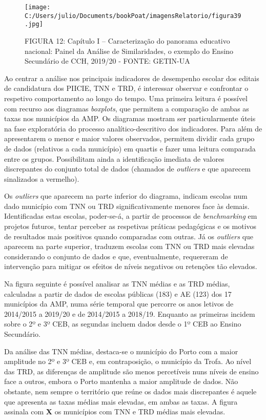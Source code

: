 \documentclass[
]{book}
\begin{document}
\begin{figure}
\centering
\texttt{[image: C:/Users/julio/Documents/bookPoat/imagensRelatorio/figura39.jpg]}
\caption{FIGURA 12: Capítulo I -- Caracterização do panorama educativo nacional: Painel da Análise de Similaridades, o exemplo do Ensino Secundário de CCH, 2019/20 - FONTE: GETIN-UA}
\end{figure}

Ao centrar a análise nos principais indicadores de desempenho escolar dos editais de candidatura dos PIICIE, TNN e TRD, é interessar observar e confrontar o respetivo comportamento ao longo do tempo. Uma primeira leitura é possível com recurso aos diagramas \emph{boxplots}, que permitem a comparação de ambas as taxas nos municípios da AMP. Os diagramas mostram ser particularmente úteis na fase exploratória do processo analítico-descritivo dos indicadores. Para além de apresentarem o menor e maior valores observados, permitem dividir cada grupo de dados (relativos a cada município) em quartis e fazer uma leitura comparada entre os grupos. Possibilitam ainda a identificação imediata de valores discrepantes do conjunto total de dados (chamados de \emph{outliers} e que aparecem sinalizados a vermelho).

Os \emph{outliers} que aparecem na parte inferior do diagrama, indicam escolas num dado município com TNN ou TRD significativamente menores face às demais. Identificadas estas escolas, poder-se-á, a partir de processos de \emph{benchmarking} em projetos futuros, tentar perceber as respetivas práticas pedagógicas e os motivos de resultados mais positivos quando comparadas com outras. Já os \emph{outliers} que aparecem na parte superior, traduzem escolas com TNN ou TRD mais elevadas considerando o conjunto de dados e que, eventualmente, requereram de intervenção para mitigar os efeitos de níveis negativos ou retenções tão elevados.

Na figura seguinte é possível analisar as TNN médias e as TRD médias, calculadas a partir de dados de escolas públicas (183) e AE (123) dos 17 municípios da AMP, numa série temporal que percorre os anos letivos de 2014/2015 a 2019/20 e de 2014/2015 a 2018/19. Enquanto as primeiras incidem sobre o 2º e 3º CEB, as segundas incluem dados desde o 1º CEB ao Ensino Secundário.

Da análise das TNN médias, destaca-se o município do Porto com a maior amplitude no 2º e 3º CEB e, em contraposição, o município da Trofa. Ao nível das TRD, as diferenças de amplitude são menos percetíveis nuns níveis de ensino face a outros, embora o Porto mantenha a maior amplitude de dados. Não obstante, nem sempre o território que reúne os dados mais discrepantes é aquele que apresenta as taxas médias mais elevadas, em ambas as taxas. A figura assinala com \textbf{X} os municípios com TNN e TRD médias mais elevadas.
\end{document}
